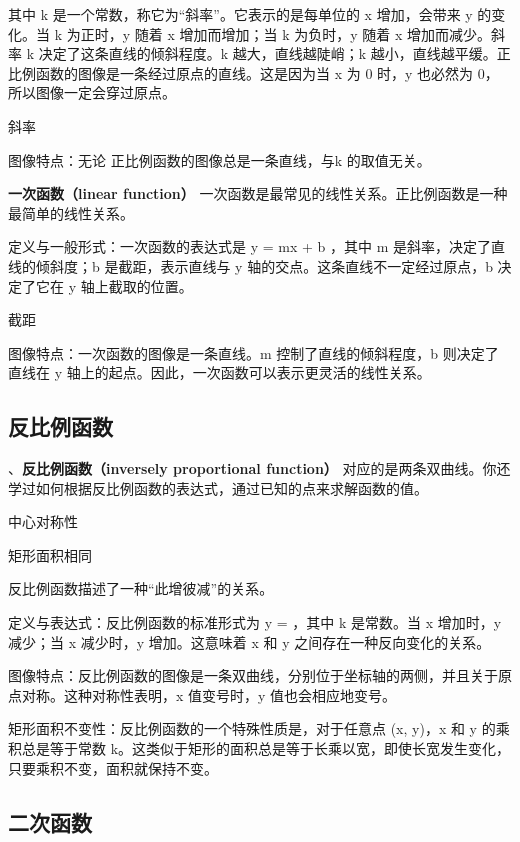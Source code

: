 其中 k 是一个常数，称它为“斜率”。它表示的是每单位的 x 增加，会带来 y 的变化。当 k 为正时，y 随着 x 增加而增加；当 k 为负时，y 随着 x 增加而减少。斜率 k 决定了这条直线的倾斜程度。k 越大，直线越陡峭；k 越小，直线越平缓。正比例函数的图像是一条经过原点的直线。这是因为当 x 为 0 时，y 也必然为 0，所以图像一定会穿过原点。
\begin{definition}{斜率}

\end{definition}

图像特点：无论 正比例函数的图像总是一条直线，与k 的取值无关。

\textbf{一次函数（linear function）}
一次函数是最常见的线性关系。正比例函数是一种最简单的线性关系。

定义与一般形式：一次函数的表达式是  y = mx + b ，其中 m 是斜率，决定了直线的倾斜度；b 是截距，表示直线与 y 轴的交点。这条直线不一定经过原点，b 决定了它在 y 轴上截取的位置。
\begin{definition}{截距}

\end{definition}
图像特点：一次函数的图像是一条直线。m 控制了直线的倾斜程度，b 则决定了直线在 y 轴上的起点。因此，一次函数可以表示更灵活的线性关系。

\subsection{反比例函数}

、\textbf{反比例函数（inversely proportional function）}
对应的是两条双曲线。你还学过如何根据反比例函数的表达式，通过已知的点来求解函数的值。

中心对称性

矩形面积相同

反比例函数描述了一种“此增彼减”的关系。

定义与表达式：反比例函数的标准形式为  y =  ，其中 k 是常数。当 x 增加时，y 减少；当 x 减少时，y 增加。这意味着 x 和 y 之间存在一种反向变化的关系。

图像特点：反比例函数的图像是一条双曲线，分别位于坐标轴的两侧，并且关于原点对称。这种对称性表明，x 值变号时，y 值也会相应地变号。

矩形面积不变性：反比例函数的一个特殊性质是，对于任意点 (x, y)，x 和 y 的乘积总是等于常数 k。这类似于矩形的面积总是等于长乘以宽，即使长宽发生变化，只要乘积不变，面积就保持不变。


\subsection{二次函数}

